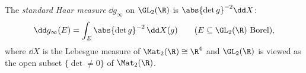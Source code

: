 The \emph{standard Haar measure} $\dd g_\infty$ on $\GL_2(\R)$ is $\abs{\det g}^{-2}\dd X$:
\[
  \dd g_\infty(E)=\int_E\abs{\det g}^{-2}\,\dd X(g)\qquad(E\subseteq\GL_2(\R)\text{ Borel}),
\]
where $\dd X$ is the Lebesgue measure of $\Mat_2(\R)\cong\R^4$ and $\GL_2(\R)$ is viewed as the open subset
$\{\det\neq0\}$ of $\Mat_2(\R)$.
